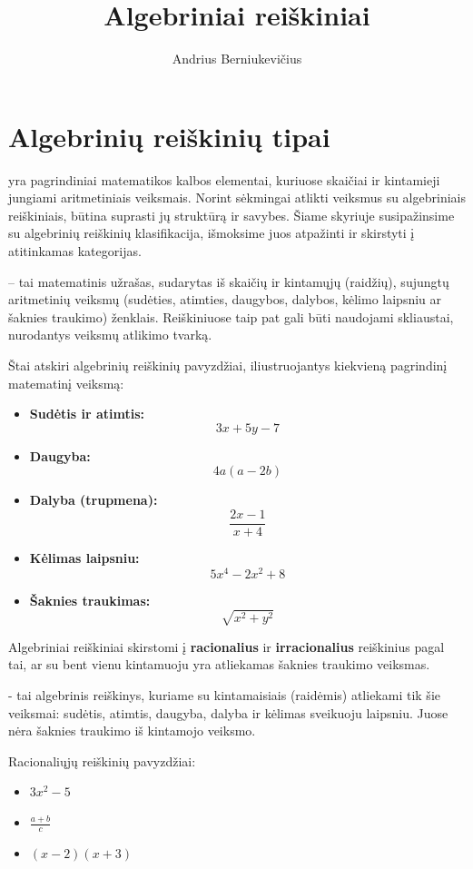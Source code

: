 \documentclass[11pt,a4paper]{scrartcl}
\title{Algebriniai reiškiniai}
\author{Andrius Berniukevičius}
\begin{document}
\maketitle


\section{Algebrinių reiškinių tipai}
 yra pagrindiniai matematikos kalbos elementai, kuriuose skaičiai ir 
kintamieji jungiami aritmetiniais veiksmais. Norint sėkmingai atlikti veiksmus su algebriniais reiškiniais, 
būtina suprasti jų struktūrą ir savybes. Šiame skyriuje susipažinsime 
su algebrinių reiškinių klasifikacija, išmoksime juos atpažinti ir skirstyti į atitinkamas kategorijas.


\begin{definition}
     – tai matematinis užrašas, sudarytas iš skaičių ir kintamųjų (raidžių), sujungtų aritmetinių veiksmų (sudėties, atimties, daugybos, dalybos, kėlimo laipsniu ar šaknies traukimo) ženklais. Reiškiniuose taip pat gali būti naudojami skliaustai, nurodantys veiksmų atlikimo tvarką.
\end{definition}

\begin{example}
Štai atskiri algebrinių reiškinių pavyzdžiai, iliustruojantys kiekvieną pagrindinį matematinį veiksmą:
\begin{itemize}
    \item \textbf{Sudėtis ir atimtis:} 
    \[ 3x + 5y - 7 \]
    
    \item \textbf{Daugyba:} 
    \[ 4a(a - 2b) \]
    
    \item \textbf{Dalyba (trupmena):} 
    \[ \frac{2x - 1}{x + 4} \]
    
    \item \textbf{Kėlimas laipsniu:} 
    \[ 5x^4 - 2x^2 + 8 \]
    
    \item \textbf{Šaknies traukimas:} 
    \[ \sqrt{x^2 + y^2} \]
\end{itemize}
\end{example}

Algebriniai reiškiniai skirstomi į \textbf{racionalius} ir \textbf{irracionalius} reiškinius pagal tai, ar su bent vienu kintamuoju yra atliekamas šaknies traukimo veiksmas.
\begin{definition}
     - tai algebrinis reiškinys, kuriame su kintamaisiais (raidėmis) atliekami tik šie veiksmai: sudėtis, atimtis, daugyba, dalyba ir kėlimas sveikuoju laipsniu. Juose nėra šaknies traukimo iš kintamojo veiksmo.
\end{definition}
\begin{example}
Racionaliųjų reiškinių pavyzdžiai:
    \begin{itemize}
        \item $3x ^{2} -5$
        \item $\frac{a+b}{c} $
        \item $(x-2)(x+3)$ 
    \end{itemize}
\end{example}
\end{document}
